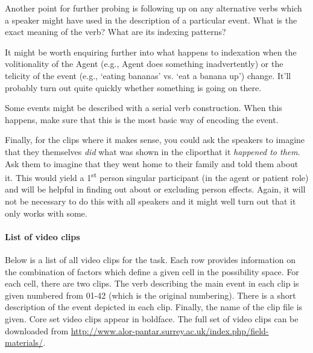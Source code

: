   Another point for further probing is following up on any alternative verbs which a speaker might have used in the description of a particular event. What is the exact meaning of the verb? What are its indexing patterns?

  It might be worth enquiring further into what happens to indexation when the volitionality of the Agent (e.g., Agent does something inadvertently) or the telicity of the event (e.g., `eating bananas' vs. `eat a banana up') change. It'll probably turn out quite quickly whether something is going on there.

  Some events might be described with a serial verb construction. When this happens, make sure that this is the most basic way of encoding the event. 

  Finally, for the clips where it makes sense, you could ask the speakers to imagine that they themselves \textit{did} what was shown in the clip\textit{}or\textit{}that it \textit{happened to them}. Ask them to imagine that they went home to their family and told them about it. This would yield a 1\textsuperscript{st} person singular participant (in the agent or patient role) and will be helpful in finding out about or excluding person effects. Again, it will not be necessary to do this with all speakers and it might well turn out that it only works with some.

\paragraph{List of video clips}

Below is a list of all video clips for the task. Each row provides information on the combination of factors which define a given cell in the possibility space. For each cell, there are two clips. The verb describing the main event in each clip is given numbered from 01-42 (which is the original numbering). There is a short description of the event depicted in each clip. Finally, the name of the clip file is given. Core set video clips appear in boldface. The full set of video clips can be downloaded from \url{http://www.alor-pantar.surrey.ac.uk/index.php/field-materials/}.




